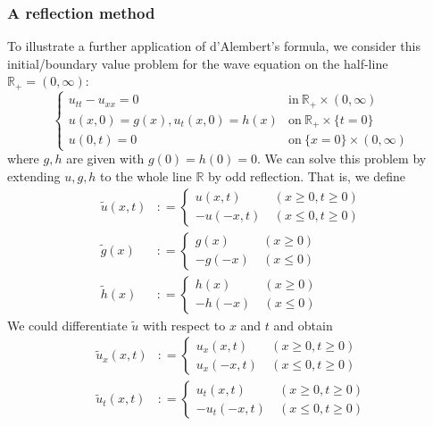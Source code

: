 \documentclass[10pt]{article}
\def\rr{{\mathbb R}}
\begin{document}
\subsubsection{A reflection method}
To illustrate a further application of d'Alembert's formula, we consider this initial/boundary value problem for the wave equation on the half-line $\rr_+ = (0,\infty)$:
\begin{equation}
    \label{halfline}
    \begin{cases}
        u_{tt} - u_{xx} = 0 & \text{in} \ \rr_+ \times (0,\infty)\\
        u(x,0) = g(x), u_t(x,0) = h(x) & \text{on} \ \rr_+ \times \{t=0\}\\
        u(0,t) = 0 & \text{on} \ \{x=0\}\times(0,\infty)
    \end{cases}
\end{equation}
where $g,h$ are given with $g(0) = h(0) = 0$. We can solve this problem by extending $u,g,h$ to the whole line $\rr$ by odd reflection. That is, we define
\begin{align*}
    \widetilde{u}(x,t)&: = \begin{cases}
        u(x,t) & \ (x \geq 0, t\geq 0)\\
        -u(-x,t) &  \ (x \leq 0, t\geq 0)
                            \end{cases}\\
    \widetilde{g}(x)&: = \begin{cases}
        g(x) & \ (x \geq 0)\\
        -g(-x) & \ (x \leq 0)
                            \end{cases}\\
    \widetilde{h}(x)&: = \begin{cases}
        h(x) & \ (x \geq 0)\\
        -h(-x) & \ (x \leq 0)
                            \end{cases}
\end{align*}
We could differentiate $\widetilde{u}$ with respect to $x$ and $t$ and obtain
\begin{align*}
    \widetilde{u}_x(x,t)&: = \begin{cases}
        u_x(x,t) & \ (x \geq 0, t\geq 0)\\
        u_x(-x,t) &  \ (x \leq 0, t\geq 0)
                            \end{cases}\\
    \widetilde{u}_t(x,t)&: = \begin{cases}
        u_t(x,t) & \ (x \geq 0, t\geq 0)\\
        -u_t(-x,t) &  \ (x \leq 0, t\geq 0)
                            \end{cases}
\end{align*}
\end{document}
